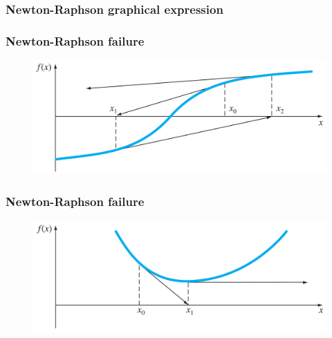 \documentclass[notes]{beamer}
\begin{document}
\begin{frame}
	\frametitle{Newton-Raphson graphical expression}
\end{frame}

\begin{frame}
	\frametitle{Newton-Raphson failure}
	\begin{figure}[ht]
		\centering
		\includegraphics[width=\textwidth]{figs/nr-1.png}
	\end{figure}
\end{frame}


\begin{frame}
	\frametitle{Newton-Raphson failure}
	\begin{figure}[ht]
		\centering
		\includegraphics[width=\textwidth]{figs/nr-2.png}
	\end{figure}
\end{frame}
\end{document}
